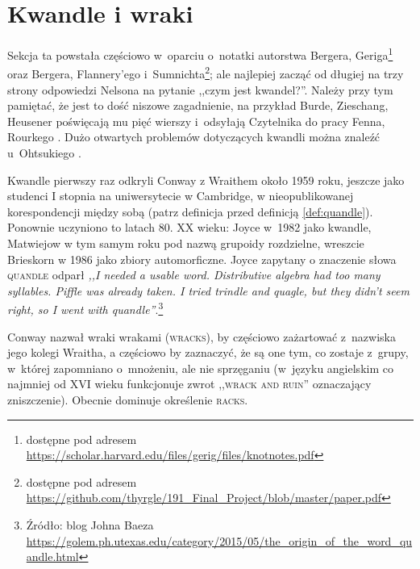 
\section{Kwandle i wraki}
%

Sekcja ta powstała częściowo w~oparciu o~notatki autorstwa Bergera, Geriga\footnote{dostępne pod adresem \url{https://scholar.harvard.edu/files/gerig/files/knotnotes.pdf}} oraz Bergera, Flannery'ego i~Sumnichta\footnote{dostępne pod adresem \url{https://github.com/thyrgle/191_Final_Project/blob/master/paper.pdf}}; ale najlepiej zacząć od długiej na trzy strony odpowiedzi Nelsona \cite{nelson2016} na pytanie ,,czym jest kwandel?''.
%
%
%
%
%
Należy przy tym pamiętać, że jest to dość niszowe zagadnienie, na przykład Burde, Zieschang, Heusener \cite[s. 11]{burde2014} poświęcają mu pięć wierszy i~odsyłają Czytelnika do pracy Fenna, Rourkego \cite{fenn1992}.
%
%
Dużo otwartych problemów dotyczących kwandli można znaleźć u~Ohtsukiego \cite[s. 455-465]{ohtsuki2002}.

Kwandle pierwszy raz odkryli Conway z Wraithem około 1959 roku, jeszcze jako studenci I stopnia na uniwersytecie w Cambridge, w nieopublikowanej korespondencji między sobą (patrz definicja przed definicją \ref{def:quandle}).
%
%
Ponownie uczyniono to latach 80. XX wieku: Joyce w~1982 jako kwandle, Matwiejow w tym samym roku pod nazwą grupoidy rozdzielne, wreszcie Brieskorn w 1986 jako zbiory automorficzne.
%
%
%
%
%
Joyce zapytany o znaczenie słowa \textsc{quandle} odparł \emph{,,I needed a usable word. Distributive algebra had too many syllables. Piffle was already taken. I tried trindle and quagle, but they didn’t seem right, so I went with quandle''}.\footnote{Źródło: blog Johna Baeza \url{https://golem.ph.utexas.edu/category/2015/05/the_origin_of_the_word_quandle.html}}
%

Conway nazwał wraki wrakami (\textsc{wracks}), by częściowo zażartować z~nazwiska jego kolegi Wraitha, a częściowo by zaznaczyć, że są one tym, co zostaje z~grupy, w~której zapomniano o~mnożeniu, ale nie sprzęganiu (w~języku angielskim co najmniej od XVI wieku funkcjonuje zwrot ,,\textsc{wrack and ruin}'' oznaczający zniszczenie).
%
%
Obecnie dominuje określenie \textsc{racks}.

